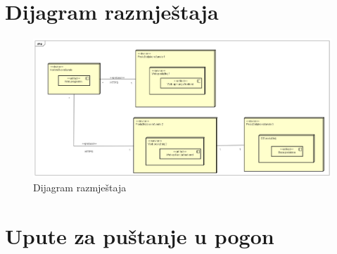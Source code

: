 	\eject
	
	\section{Dijagram razmještaja}
	\begin{figure}[H]
		\includegraphics[width=\linewidth]{slike/DeploymentDiagram0.png}
		\centering
		\caption{Dijagram razmještaja}
		\label{fig:dijagramrazmještaja}
	\end{figure}
\eject
\section{Upute za puštanje u pogon}

